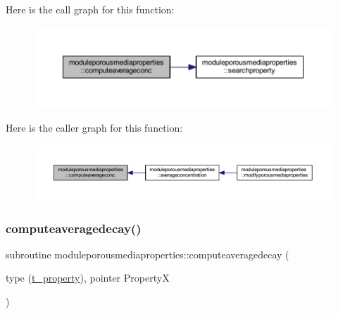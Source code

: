 Here is the call graph for this function\+:\nopagebreak
\begin{figure}[H]
\begin{center}
\leavevmode
\includegraphics[width=350pt]{namespacemoduleporousmediaproperties_ab84b0ba6c0a1df355fb649c05128fbb3_cgraph}
\end{center}
\end{figure}
Here is the caller graph for this function\+:\nopagebreak
\begin{figure}[H]
\begin{center}
\leavevmode
\includegraphics[width=350pt]{namespacemoduleporousmediaproperties_ab84b0ba6c0a1df355fb649c05128fbb3_icgraph}
\end{center}
\end{figure}
\mbox{\label{namespacemoduleporousmediaproperties_a3d3bfa08325114d10c44b11e29d42d78}} 
\subsubsection{\texorpdfstring{computeaveragedecay()}{computeaveragedecay()}}
{\footnotesize\ttfamily subroutine moduleporousmediaproperties\+::computeaveragedecay (\begin{DoxyParamCaption}\item[{type (\mbox{\hyperlink{structmoduleporousmediaproperties_1_1t__property}{t\+\_\+property}}), pointer}]{PropertyX }\end{DoxyParamCaption})\hspace{0.3cm}{\ttfamily [private]}}

